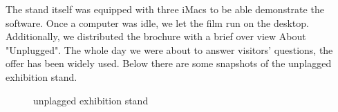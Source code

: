 \pagebreak

The stand itself was equipped with three iMacs to be able demonstrate the software.
Once a computer was idle, we let the film run on the desktop.
Additionally, we distributed the brochure with a brief over view About "Unplugged".
The whole day we were about to answer visitors' questions, the offer has been widely used.
Below there are some snapshots of the unplagged exhibition stand.

\begin{figure}[!hbtp]
  \centering
  \caption{unplagged exhibition stand}
  \label{fig:unplagged_exhibition_stand2}
\end{figure}

\pagebreak 

